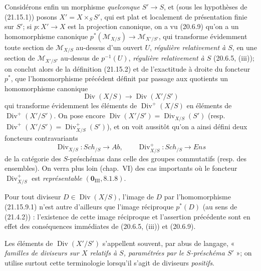 \begin{env}[21.15.9]
Considérons enfin un morphisme \emph{quelconque} $S'\to S$, et (sous les hypothèses de
(21.15.1)) posons $X'=X\times_S S'$, qui est plat et localement de présentation finie
sur $S'$; si $p:X'\to X$ est la projection canonique, on a vu (20.6.9) qu'on a un
homomorphisme canonique
$p^*(\mathscr M_{X/S})\to\mathscr M_{X'/S'}$, qui transforme évidemment toute
section de $\mathscr M_{X/S}$ au-dessus d'un ouvert $U$, \emph{régulière relativement
à $S$}, en une section de $\mathscr M_{X'/S'}$ au-dessus de $p^{-1}(U)$, \emph{régulière
relativement à $S$} (20.6.5, (iii)); on conclut alors de la
définition (21.15.2) et de l'exactitude à droite du foncteur $p^*$, que
l'homomorphisme précédent définit par passage aux quotients un homomorphisme canonique
\[
\label{IV.21.15.9.1}
  \operatorname{Div}(X/S)\longrightarrow\operatorname{Div}(X'/S')
  \tag{21.15.9.1}
\]
qui transforme évidemment les éléments de $\operatorname{Div}^+(X/S)$ en éléments de
$\operatorname{Div}^+(X'/S')$. On pose encore
$\operatorname{Div}(X'/S')=\operatorname{Div}_{X/S}(S')$ (resp.
$\operatorname{Div}^+(X'/S')=\operatorname{Div}_{X/S}^+(S')$), et on voit aussitôt
qu'on a ainsi défini deux foncteurs contravariants
\[
  \operatorname{Div}_{X/S}:\boldsymbol{\mathit{Sch}}_{/S}\longrightarrow\boldsymbol{\mathit{Ab}},\qquad
  \operatorname{Div}_{X/S}^+:\boldsymbol{\mathit{Sch}}_{/S}\longrightarrow\boldsymbol{\mathit{Ens}}
\]
de la catégorie des $S$-préschémas dans celle des groupes commutatifs (resp. des
ensembles). On verra plus loin (chap.~VI) des cas importants où le foncteur
$\operatorname{Div}_{X/S}^+$ est \emph{représentable} $(\mathbf 0_{\mathrm{III}},
8.1.8)$.

Pour tout diviseur $D\in\operatorname{Div}(X/S)$, l'image de $D$ par
l'homomorphisme (21.15.9.1) n'est autre d'ailleurs que l'image réciproque
$p^*(D)$ (au sens de (21.4.2)) : l'existence de cette image réciproque et l'assertion
précédente sont en effet des conséquences immédiates de (20.6.5, (iii)) et (20.6.9).

Les éléments de $\operatorname{Div}(X'/S')$ s'appellent souvent, par abus de langage,
« \emph{familles de diviseurs sur $X$ relatifs à $S$, paramétrées par le
$S$-préschéma $S'$} »; on utilise surtout cette terminologie lorsqu'il s'agit de
diviseurs \emph{positifs}.
\end{env}
